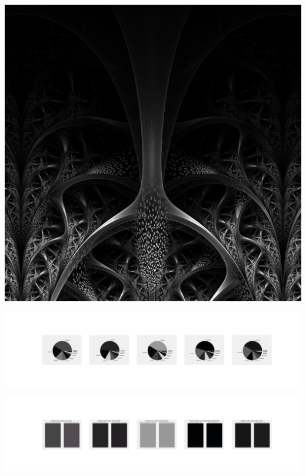 \documentclass[11pt]{article}
\begin{document}
\begin{landscape}
    \begin{center}
    \includegraphics[width=\textwidth]{./nbimg/file (247).jpg}
    \end{center}

    \begin{center}
    \includegraphics[width=250mm]{./nbimg/pie-164.jpg}
    \end{center}

    \begin{center}
    \includegraphics[width=250mm]{./nbimg/peak-164.jpg}
    \end{center}
    


\end{landscape}
\end{document}

